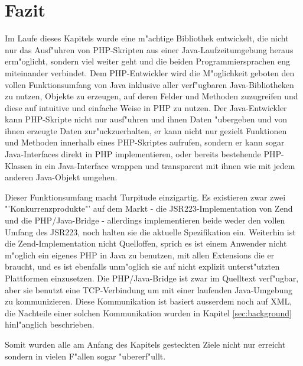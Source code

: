 \section{Fazit}
\label{sec:chap1:fazit}

Im Laufe dieses Kapitels wurde eine m"achtige Bibliothek entwickelt, die nicht nur das Ausf"uhren von
PHP-Skripten aus einer Java-Laufzeitumgebung heraus erm"oglicht, sondern viel weiter geht und die beiden
Programmiersprachen eng miteinander verbindet. Dem PHP-Entwickler wird die M"oglichkeit geboten den
vollen Funktionsumfang von Java inklusive aller verf"ugbaren Java-Bibliotheken zu nutzen, Objekte zu erzeugen,
auf deren Felder und Methoden zuzugreifen und diese auf intuitive und einfache Weise in PHP zu nutzen.
Der Java-Entwickler kann PHP-Skripte nicht nur ausf"uhren und ihnen Daten "ubergeben und von ihnen erzeugte
Daten zur"uckzuerhalten, er kann nicht nur gezielt Funktionen und Methoden innerhalb eines PHP-Skriptes
aufrufen, sondern er kann sogar Java-Interfaces direkt in PHP implementieren, oder bereits bestehende PHP-Klassen
in ein Java-Interface wrappen und transparent mit ihnen wie mit jedem anderen Java-Objekt umgehen.

Dieser Funktionsumfang macht Turpitude einzigartig. Es existieren zwar zwei "'Konkurrenzprodukte"' auf dem
Markt - die JSR223-Implementation von Zend und die PHP/Java-Bridge \cite{BRIDGEHP} - allerdings implementieren
beide weder den vollen Umfang des JSR223, noch halten sie die aktuelle Spezifikation ein. Weiterhin ist die
Zend-Implementation nicht Quelloffen, sprich es ist einem Anwender nicht m"oglich ein eigenes PHP in Java
zu benutzen, mit allen Extensions die er braucht, und es ist ebenfalls unm"oglich sie auf nicht explizit
unterst"utzten Plattformen einzusetzen. Die PHP/Java-Bridge ist zwar im Quelltext verf"ugbar, aber sie
benutzt eine TCP-Verbindung um mit einer laufenden Java-Umgebung zu kommunizieren. Diese Kommunikation
ist basiert ausserdem noch auf XML, die Nachteile einer solchen Kommunikation wurden in Kapitel \ref{sec:background}
hinl"anglich beschrieben. 

Somit wurden alle am Anfang des Kapitels gesteckten Ziele nicht nur erreicht sondern in vielen F"allen sogar
"ubererf"ullt.

